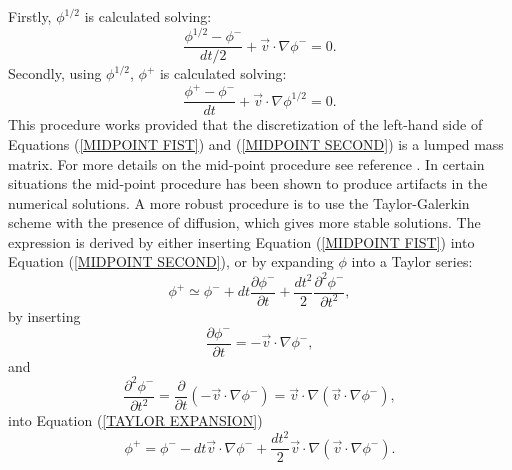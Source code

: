 Firstly, $\phi^{1/2}$ is calculated solving:
%
\begin{equation}
\frac{\phi^{1/2} - \phi^{-}}{dt/2} + \vec{v} \cdot \nabla \phi^{-} = 0.
\label{MIDPOINT FIST}
\end{equation}
%
Secondly, using $\phi^{1/2}$, $\phi^{+}$ is calculated solving:
%
\begin{equation}
\frac{\phi^{+} - \phi^{-}}{dt} + \vec{v} \cdot \nabla \phi^{1/2} = 0.
\label{MIDPOINT SECOND}
\end{equation}
%
This procedure works provided that the discretization of the left-hand side of Equations (\ref{MIDPOINT FIST}) and (\ref{MIDPOINT SECOND}) is a lumped mass matrix. For more details on the mid-point procedure see reference \cite{BOURGOUIN2006}. In certain situations the mid-point procedure has been shown to produce artifacts in the numerical solutions. A more robust procedure is to use the Taylor-Galerkin scheme with the presence of diffusion, which gives more stable solutions. The expression is derived by either inserting Equation (\ref{MIDPOINT FIST}) into Equation (\ref{MIDPOINT SECOND}), or by expanding $\phi$ into a Taylor series:
%
\begin{equation}
\phi^{+} \simeq \phi^{-} + dt\frac{\partial \phi^{-}}{\partial t} + \frac{dt^2}{2}\frac{\partial^{2}\phi^{-}}{\partial t^{2}},
\label{TAYLOR EXPANSION}
\end{equation}
%
by inserting
%
\begin{equation}
\frac{\partial \phi^{-}}{\partial t} = - \vec{v} \cdot \nabla \phi^{-},
\label{INSERT ADVECTION}
\end{equation}
%
and
%
\begin{equation}
\frac{\partial^{2} \phi^{-}}{\partial t^{2}} = \frac{\partial}{\partial t}(-\vec{v} \cdot \nabla \phi^{-}) = \vec{v}\cdot \nabla (\vec{v}\cdot \nabla \phi^{-}),
\label{SECOND ORDER}
\end{equation}
%
into Equation (\ref{TAYLOR EXPANSION})
%
\begin{equation}
\phi^{+} = \phi^{-} - dt\vec{v}\cdot \nabla \phi^{-} + \frac{dt^2}{2}\vec{v}\cdot \nabla (\vec{v}\cdot \nabla \phi^{-}).
\label{TAYLOR GALERKIN}
\end{equation}




